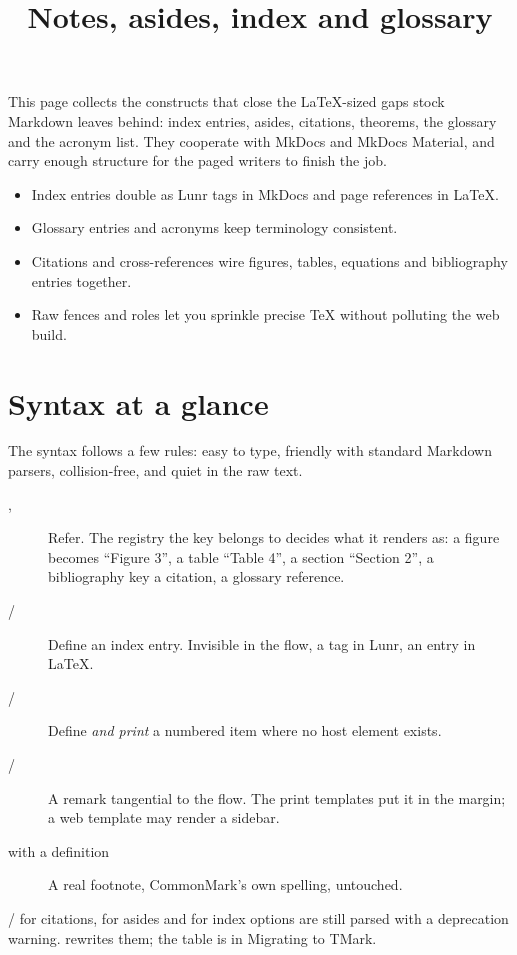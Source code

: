 \documentclass[a4paper,twoside]{article}
\title{Notes, asides, index and glossary}
\author{}\date{}
\begin{document}
\maketitle
This page collects the constructs that close the \LaTeX{}-sized gaps stock Markdown
leaves behind: index entries, asides, citations, theorems, the glossary and the
acronym list. They cooperate with MkDocs and MkDocs Material, and carry enough
structure for the paged writers to finish the job.
\begin{itemize}
\item Index entries double as Lunr tags in MkDocs and page references in \LaTeX{}.
\item Glossary entries and acronyms keep terminology consistent.
\item Citations and cross-references wire figures, tables, equations and
bibliography entries together.
\item Raw fences and roles let you sprinkle precise \TeX{} without polluting the web
build.
\end{itemize}
\section{Syntax at a glance}
The syntax follows a few rules: easy to type, friendly with standard Markdown
parsers, collision-free, and quiet in the raw text.
\begin{description}
\item[{, }] Refer. The registry the key belongs to decides what it renders as: a figure
becomes ``Figure 3'', a table ``Table 4'', a section ``Section 2'', a
bibliography key a citation,  a glossary reference.
\item[{ / \tscodeinline{\#[term]}}] Define an index entry. Invisible in the flow, a tag in Lunr, an 
entry in \LaTeX{}.
\item[{ / }] Define \emph{and print} a numbered item where no host element exists.
\item[{ / }] A remark tangential to the flow. The print templates put it in the margin;
a web template may render a sidebar.
\item[{\tscodeinline{[\^{}1]} with a  definition}] A real footnote, CommonMark's own spelling, untouched.
\end{description}
\begin{tscallout}[kind=note, title={0.6 spellings}]
\tscodeinline{\^{}[key]} / \tscodeinline{[\^{}key]} for citations,  for asides and
 for index options are still parsed with a deprecation
warning.  rewrites them; the table is in
Migrating to TMark.
\end{tscallout}
\end{document}
